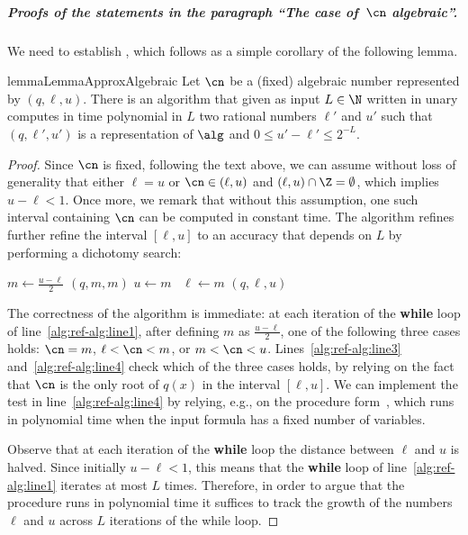 \subparagraph*{Proofs of the statements in the paragraph ``The case of~$\cn$
algebraic''.} We need to establish , which
follows as a simple corollary of the following lemma.

\begin{restatable}{lemma}{LemmaApproxAlgebraic}
  \label{lemma:approx-algebraic}
  Let $\cn$ be a (fixed) algebraic number represented by $(q,\ell,u)$. 
  There is an algorithm that given as input $L \in \N$ written in unary 
  computes in time polynomial in $L$ two rational numbers $\ell'$ and $u'$ 
  such that $(q,\ell',u')$ is a representation of $\alg$ 
  and $0 \leq u'-\ell' \leq 2^{-L}$.  
\end{restatable}
\begin{proof}
  Since $\cn$ is fixed, following the text above, we can assume without loss of generality that either $\ell = u$ or $\cn \in (\ell,u)$ and $(\ell,u) \cap \Z = \emptyset$, 
  which implies $u-\ell < 1$. 
  Once more, we remark that without this assumption, one such interval containing $\cn$ 
  can be computed in constant time. 
  The algorithm refines further refine the interval $[\ell,u]$ to an accuracy that depends on $L$ by performing a dichotomy search: 
  \begin{algorithmic}[1]
    \label{alg:ref-alg:line1}
      \State $m \gets \frac{u-\ell}{2}$
      \label{alg:ref-alg:line2}
        \myreturn $(q,m,m)$
        \label{alg:ref-alg:line3} 
      \EndIf
        $u \gets m$
        \label{alg:ref-alg:line4}
      \Else \ $\ell \gets m$
        \label{alg:ref-alg:line5}
      \EndIf
    \EndWhile
    \State \myreturn $(q,\ell,u)$
  \end{algorithmic}
  The correctness of the algorithm is immediate: at each iteration of the
  \textbf{while} loop of line~\ref{alg:ref-alg:line1}, after defining $m$ as
  $\frac{u-\ell}{2}$, one of the following three cases holds: $\cn = m$, $\ell <
  \cn < m$, or $m < \cn < u$. Lines~\ref{alg:ref-alg:line3}
  and~\ref{alg:ref-alg:line4} check which of the three cases holds, by relying
  on the fact that $\cn$ is the only root of $q(x)$ in the interval $[\ell,u]$.
  We can implement the test in line~\ref{alg:ref-alg:line4} by relying, e.g., on
  the procedure form~, which runs in polynomial time when 
  the input formula has a fixed number of variables.

  Observe that at each iteration of the \textbf{while} loop the distance between $\ell$ and $u$ is halved.
  Since initially $u-\ell < 1$, this means that the \textbf{while} loop of
  line~\ref{alg:ref-alg:line1} iterates at most $L$ times.
  Therefore, in order to argue that 
  the procedure runs in polynomial time 
  it suffices to track the growth of the numbers $\ell$ and $u$ across $L$ iterations of the while loop.


\end{proof}
